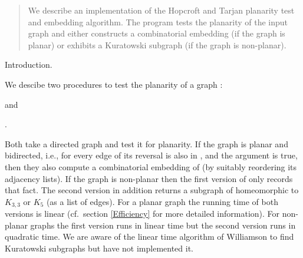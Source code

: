 
\vspace*{2.2cm}

\begin{abstract}
We describe an implementation of the Hopcroft and Tarjan planarity test and
embedding algorithm. The program tests the planarity of the input
graph and either constructs a combinatorial embedding (if the graph
is planar) or exhibits a Kuratowski subgraph (if the graph is non-planar).

\end{abstract}

\tableofcontents


Introduction.

We descibe two procedures to test the planarity of a graph :

\begin{center}
\end{center}

and

\begin{center}
.
\end{center}

Both take a directed graph  and test it for planarity.
If the graph is planar and bidirected, i.e., for every edge of  its
reversal is also in , and the argument  is true, then
they
also compute a combinatorial embedding of  (by suitably reordering
its adjacency lists). If the graph  is
non-planar then the first version of  only records that fact.
The second version in addition returns a subgraph of  homeomorphic
to $K_{3,3}$ or $K_5$ (as a list  of edges). For a planar graph
 the running time of
both versions is linear (cf.\ section \ref{Efficiency} for more
detailed information). For non-planar graphs  the
first version runs in linear time but the second version runs in
quadratic time.
We are aware of the linear time algorithm of Williamson
\cite{Williamson:Kuratowski} to find Kuratowski subgraphs but have
not implemented it.

